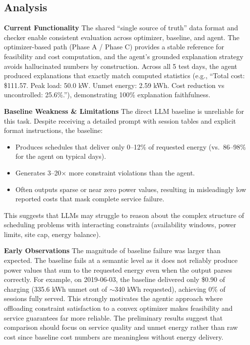 \documentclass{article}
\begin{document}
\subsection{Analysis}
\textbf{Current Functionality}
The shared ``single source of truth'' data format and checker enable consistent evaluation across optimizer, baseline, and agent. The optimizer-based path (Phase A / Phase C) provides a stable reference for feasibility and cost computation, and the agent's grounded explanation strategy avoids hallucinated numbers by construction. Across all 5 test days, the agent produced explanations that exactly match computed statistics (e.g., ``Total cost: \$111.57. Peak load: 50.0 kW. Unmet energy: 2.59 kWh. Cost reduction vs uncontrolled: 25.6\%.''), demonstrating 100\% explanation faithfulness.

\textbf{Baseline Weakness \& Limitations}
The direct LLM baseline is unreliable for this task. Despite receiving a detailed prompt with session tables and explicit format instructions, the baseline:
\begin{itemize}
  \item Produces schedules that deliver only 0--12\% of requested energy (vs.\ 86--98\% for the agent on typical days).
  \item Generates 3--20$\times$ more constraint violations than the agent.
  \item Often outputs sparse or near zero power values, resulting in misleadingly low reported costs that mask complete service failure.
\end{itemize}
This suggests that LLMs may struggle to reason about the complex structure of scheduling problems with interacting constraints (availability windows, power limits, site cap, energy balance).

\textbf{Early Observations}
The magnitude of baseline failure was larger than expected. The baseline fails at a semantic level as it does not reliably produce power values that sum to the requested energy even when the output parses correctly. For example, on 2019-06-03, the baseline delivered only \$0.90 of charging (335.6 kWh unmet out of $\sim$340 kWh requested), achieving 0\% of sessions fully served. This strongly motivates the agentic approach where offloading constraint satisfaction to a convex optimizer makes feasibility and service guarantees far more reliable. The preliminary results suggest that comparison should focus on service quality and unmet energy rather than raw cost since baseline cost numbers are meaningless without energy delivery.
\end{document}
